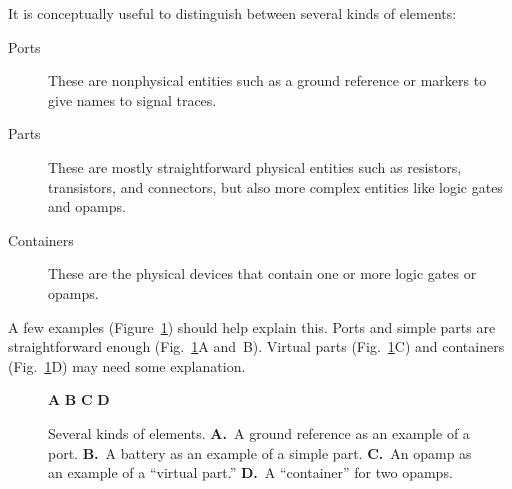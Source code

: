 \documentclass[11pt]{report}
\begin{document}
It is conceptually useful to distinguish between several kinds of
elements:
\begin{description}
  \item[Ports] These are nonphysical entities such as a ground
    reference or markers to give names to signal traces.
    \item[Parts] These are mostly straightforward physical entities such as resistors,
      transistors, and connectors, but also more complex entities like
      logic gates and opamps.
    \item[Containers] These are the physical devices that contain
      one or more logic gates or opamps.
\end{description}

A few examples (Figure~\ref{parteg}) should help explain this. Ports
and simple parts are straightforward enough (Fig.~\ref{parteg}A
and~B). Virtual parts (Fig.~\ref{parteg}C) and containers
(Fig.~\ref{parteg}D) may need some explanation.

\def\subfig#1#2{{\sf\small\bfseries#1}\raisebox{-.2in}{\raisebox{-.5\height}{\texttt{[image: \#2]}}}}
\def\subfigh#1#2#3{{\sf\small\bfseries#1}\raisebox{.1in}{\raisebox{-\height}{\texttt{[image: \#2]}}}}

\begin{figure}[h]
  \mbox{}\hfill
  \subfig{A}{ug-ground}
  \hfill
  \subfig{B}{ug-battery}
  \hfill
  \subfig{C}{ug-opamp}
  \hfill
  \subfig{D}{ug-opamp-cont}
  \hfill\mbox{}
  \caption{Several kinds of elements. {\bf A.}~A ground reference as
    an example of a port. {\bf B.}~A battery as an example of a simple
    part. {\bf C.}~An opamp as an example of a ``virtual part.'' {\bf
      D.}~A ``container'' for two opamps.}\label{parteg}
\end{figure}
\end{document}

